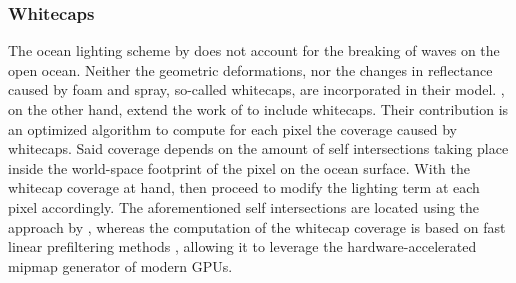 %
%
\subsubsection{Whitecaps}
The ocean lighting scheme by \citet{article:oceanlighting} does not account for
the breaking of waves on the open ocean. Neither the geometric deformations,
nor the changes in reflectance caused by foam and spray, so-called
whitecaps, are incorporated in their model. \citet{article:whitecaps},
on the other hand, extend the work of \citet{misc:oceanlightingfft}
to include whitecaps.
Their contribution is an optimized algorithm to compute for each pixel the
coverage caused by whitecaps. Said coverage depends on the amount of self
intersections taking place inside the world-space footprint of the pixel on
the ocean surface. With the whitecap coverage at hand,
\citeauthor{article:whitecaps} then proceed to modify the lighting term at each
pixel accordingly.
The aforementioned self intersections are located using the approach by
\citet{course:simulatingocean}, whereas the computation of the whitecap
coverage is based on fast linear prefiltering methods \citep{Bruneton:2012},
allowing it to leverage the hardware-accelerated mipmap generator of modern GPUs.

